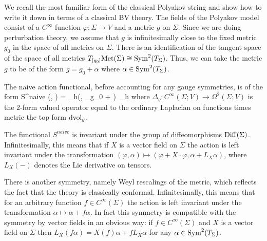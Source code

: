 
We recall the most familiar form of the classical Polyakov string and show how to write it down in terms of a classical BV theory. The fields of the Polyakov model consist of a $C^\infty$ function $\varphi : \Sigma \to V$ and a metric $g$ on $\Sigma$. Since we are doing perturbation theory, we assume that $g$ is infinitesimally close to the fixed metric $g_0$ in the space of all metrics on $\Sigma$. There is an identification of the tangent space of the space of all metrics $T_{[g_0]} {\rm Met}(\Sigma) \cong {\rm Sym}^2(T_\Sigma)$. Thus, we can take the metric $g$ to be of the form $g = g_0 + \alpha$ where $\alpha \in {\rm Sym}^2(T_\Sigma)$. 
 
The naive action functional, before accounting for any gauge symmetries, is of the form
\ben
S^{naive} (\varphi, \alpha) = \int_\Sigma h(\varphi, \Delta_{g_0 + \alpha} \varphi)\, \dvol_h
\een
where $\Delta_g : C^\infty(\Sigma ; V) \to \Omega^2(\Sigma ; V)$ is the $2$-form valued operator equal to the ordinary Laplacian on functions times metric the top form ${\rm dvol}_g$. 

The functional $S^{naive}$ is invariant under the group of diffeomorphisms ${\rm Diff}(\Sigma)$. Infinitesimally, this means that if $X$ is a vector field on $\Sigma$ the action is left invariant under the transformation $(\varphi,\alpha) \mapsto (\varphi + X \cdot \varphi, \alpha + L_X \alpha)$, where $L_X(-)$ denotes the Lie derivative on tensors. 

There is another symmetry, namely Weyl rescalings of the metric, which reflects the fact that the theory is classically conformal. Infinitesimally, this means that for an arbitrary function $f \in C^\infty(\Sigma)$ the action is left invariant under the transformation $\alpha \mapsto \alpha + f \alpha$. In fact this symmetry is compatible with the symmetry by vector fields in an obvious way: if $f \in C^\infty(\Sigma)$ and $X$ is a vector field on $\Sigma$ then $L_{X} (f \alpha) = X(f) \alpha + f L_X \alpha$ for any $\alpha \in {\rm Sym}^2(T_\Sigma)$. 


